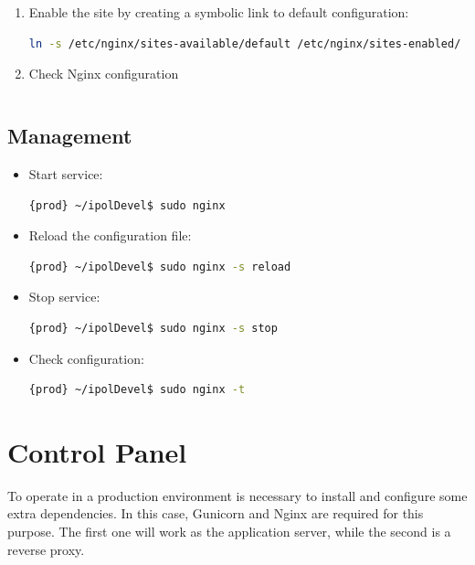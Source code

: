 \documentclass[a4paper,12pt]{article}
\begin{document}
\begin{enumerate}
\begin{enumerate}
\begin{enumerate}
\end{enumerate}
\end{enumerate}
\item Enable the site by creating a symbolic link to default configuration:
\begin{lstlisting}[language=Bash]
ln -s /etc/nginx/sites-available/default /etc/nginx/sites-enabled/
\end{lstlisting}
\item Check Nginx configuration
\begin{lstlisting}[language=Bash]

\end{lstlisting}
\end{enumerate}

\subsection{Management}

\begin{itemize}
\item Start service:
\begin{lstlisting}[language=Bash]
{prod} ~/ipolDevel$ sudo nginx
\end{lstlisting}
\item Reload the configuration file:
\begin{lstlisting}[language=Bash]
{prod} ~/ipolDevel$ sudo nginx -s reload
\end{lstlisting}
\item Stop service:
\begin{lstlisting}[language=Bash]
{prod} ~/ipolDevel$ sudo nginx -s stop
\end{lstlisting}
\item Check configuration:
\begin{lstlisting}[language=Bash]
{prod} ~/ipolDevel$ sudo nginx -t
\end{lstlisting}
\end{itemize}


\section{Control Panel}
To operate in a production environment is necessary to install and configure some extra dependencies. In this case, Gunicorn and Nginx are 
required for this purpose. The first one will work as the application server, while the second is a reverse proxy. 
\end{document}
